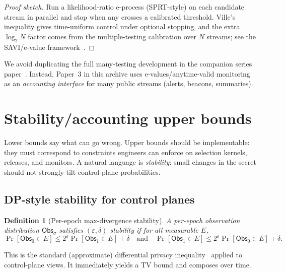 \documentclass[11pt]{article}
\newtheorem{definition}{Definition}
\begin{document}
\begin{proof}[Proof sketch]
Run a likelihood-ratio e-process (SPRT-style) on each candidate stream in parallel and stop when any crosses a calibrated threshold.
Ville's inequality gives time-uniform control under optional stopping, and the extra $\log_2 N$ factor comes from the multiple-testing calibration over $N$ streams; see the SAVI/e-value framework~\cite{ramdas2024evalues,wang2025sebH}.
\end{proof}

We avoid duplicating the full many-testing development in the companion series paper~\cite{series:manytestinglowerbounds}.
Instead, Paper~3 in this archive uses e-values/anytime-valid monitoring as an \emph{accounting interface} for many public streams (alerts, beacons, summaries).


\section{Stability/accounting upper bounds}
\label{sec:upper}

Lower bounds say what can go wrong.
Upper bounds should be implementable: they must correspond to constraints engineers can enforce on selection kernels, releases, and monitors.
A natural language is \emph{stability}: small changes in the secret should not strongly tilt control-plane probabilities.

\subsection{DP-style stability for control planes}
\label{sec:dpstyle}

\begin{definition}[Per-epoch max-divergence stability]
A per-epoch observation distribution $\mathsf{Obs}_\sigma$ satisfies $(\varepsilon,\delta)$ stability if for all measurable $E$,
\[
\Pr[\mathsf{Obs}_0\in E] \le 2^{\varepsilon}\Pr[\mathsf{Obs}_1\in E]+\delta
\quad\text{and}\quad
\Pr[\mathsf{Obs}_1\in E] \le 2^{\varepsilon}\Pr[\mathsf{Obs}_0\in E]+\delta.
\]
\end{definition}

This is the standard (approximate) differential privacy inequality~\cite{dworkroth2014foundations} applied to control-plane views.
It immediately yields a TV bound and composes over time.
\end{document}
